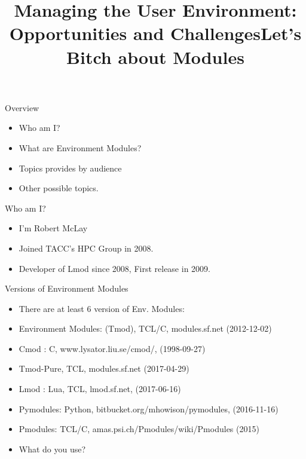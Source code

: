 \documentclass{beamer}
\begin{document}
\title[User Environment]{Managing the User Environment: Opportunities and Challenges}
\frame{\titlepage} 

\title[User Environment]{Let's Bitch about Modules}

\frame{\titlepage} 

\begin{frame}{Overview}
  \begin{itemize}
    \item Who am I?
    \item What are Environment Modules?
    \item Topics provides by audience
    \item Other possible topics.
  \end{itemize}
\end{frame}

\begin{frame}{Who am I?}
  \begin{itemize}
    \item I'm Robert McLay
    \item Joined TACC's HPC Group in 2008.
    \item Developer of Lmod since 2008, First release in 2009.
  \end{itemize}
\end{frame}

\begin{frame}{Versions of Environment Modules}
  \begin{itemize}
    \item There are at least 6 version of Env. Modules:
    \item Environment Modules: (Tmod), TCL/C, modules.sf.net (2012-12-02)
    \item Cmod : C, www.lysator.liu.se/cmod/, (1998-09-27)
    \item Tmod-Pure, TCL, modules.sf.net (2017-04-29)
    \item Lmod : Lua, TCL, lmod.sf.net, (2017-06-16)
    \item Pymodules: Python, bitbucket.org/mhowison/pymodules, 
      (2016-11-16)
    \item Pmodules: TCL/C, amas.psi.ch/Pmodules/wiki/Pmodules (2015)
    \item What do you use?
  \end{itemize}
\end{frame}
\end{document}
